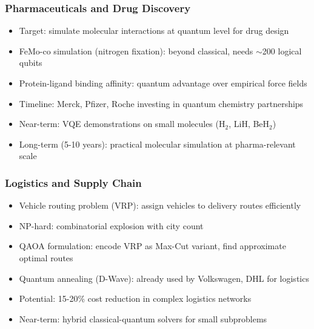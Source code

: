 \begin{frame}[fragile]\frametitle{Pharmaceuticals and Drug Discovery}
\begin{itemize}
\item Target: simulate molecular interactions at quantum level for drug design
\item FeMo-co simulation (nitrogen fixation): beyond classical, needs $\sim$200 logical qubits
\item Protein-ligand binding affinity: quantum advantage over empirical force fields
\item Timeline: Merck, Pfizer, Roche investing in quantum chemistry partnerships
\item Near-term: VQE demonstrations on small molecules (H$_2$, LiH, BeH$_2$)
\item Long-term (5-10 years): practical molecular simulation at pharma-relevant scale
\end{itemize}
\end{frame}

\begin{frame}[fragile]\frametitle{Logistics and Supply Chain}
\begin{itemize}
\item Vehicle routing problem (VRP): assign vehicles to delivery routes efficiently
\item NP-hard: combinatorial explosion with city count
\item QAOA formulation: encode VRP as Max-Cut variant, find approximate optimal routes
\item Quantum annealing (D-Wave): already used by Volkswagen, DHL for logistics
\item Potential: 15-20\% cost reduction in complex logistics networks
\item Near-term: hybrid classical-quantum solvers for small subproblems
\end{itemize}
\end{frame}

